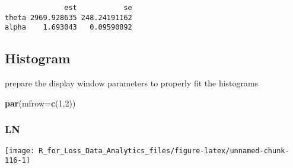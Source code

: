 \documentclass[]{book}
\newenvironment{Shaded}{\begin{snugshade}}{\end{snugshade}}
\newcommand{\KeywordTok}[1]{\textcolor[rgb]{0.13,0.29,0.53}{\textbf{#1}}}
\newcommand{\DataTypeTok}[1]{\textcolor[rgb]{0.13,0.29,0.53}{#1}}
\newcommand{\DecValTok}[1]{\textcolor[rgb]{0.00,0.00,0.81}{#1}}
\newcommand{\FloatTok}[1]{\textcolor[rgb]{0.00,0.00,0.81}{#1}}
\newcommand{\StringTok}[1]{\textcolor[rgb]{0.31,0.60,0.02}{#1}}
\newcommand{\OperatorTok}[1]{\textcolor[rgb]{0.81,0.36,0.00}{\textbf{#1}}}
\newcommand{\NormalTok}[1]{#1}
\theoremstyle{definition}
\theoremstyle{definition}
\theoremstyle{definition}
\theoremstyle{remark}
\begin{document}
\begin{verbatim}
              est           se
theta 2969.928635 248.24191162
alpha    1.693043   0.09590892
\end{verbatim}

\subsection{Histogram}\label{histogram}

prepare the display window parameters to properly fit the histograms

\begin{Shaded}
\begin{Highlighting}[]
\KeywordTok{par}\NormalTok{(}\DataTypeTok{mfrow=}\KeywordTok{c}\NormalTok{(}\DecValTok{1}\NormalTok{,}\DecValTok{2}\NormalTok{))}
\end{Highlighting}
\end{Shaded}

\subsubsection{LN}\label{ln}

\begin{Shaded}
\end{Shaded}

\begin{center}\texttt{[image: R\_for\_Loss\_Data\_Analytics\_files/figure-latex/unnamed-chunk-116-1]} \end{center}
\end{document}
